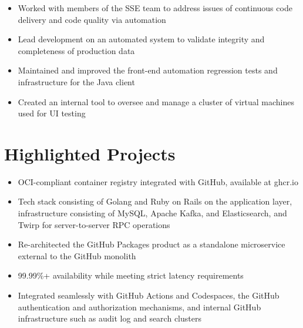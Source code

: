\documentclass[11pt,letterpaper,sans]{moderncv}        %
\begin{document}
\vspace*{-4pt}
\begin{itemize}
\item Worked with members of the SSE team to address issues of continuous code delivery and code quality via automation
\item Lead development on an automated system to validate integrity and completeness of production data
\item Maintained and improved the front-end automation regression tests and infrastructure for the Java client
\item Created an internal tool to oversee and manage a cluster of virtual machines used for UI testing
\end{itemize}
\vspace*{4pt}

\newpage

\section{Highlighted Projects}

\vspace*{-4pt}
\begin{itemize}
\item OCI-compliant container registry integrated with GitHub, available at ghcr.io
\item Tech stack consisting of Golang and Ruby on Rails on the application layer, infrastructure consisting of MySQL, Apache Kafka, and Elasticsearch, and Twirp for server-to-server RPC operations
\item Re-architected the GitHub Packages product as a standalone microservice external to the GitHub monolith
\item 99.99\%+ availability while meeting strict latency requirements
\item Integrated seamlessly with GitHub Actions and Codespaces, the GitHub authentication and authorization mechanisms, and internal GitHub infrastructure such as  audit log and search clusters
\end{itemize}
\vspace*{4pt}
\end{document}
